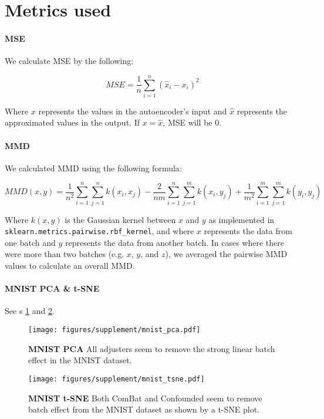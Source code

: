 \documentclass{article}
\begin{document}
\section{Metrics used}

\paragraph{MSE}

We calculate MSE by the following:

\begin{equation}
	\label{mse}
	MSE = \frac{1}{n}\sum_{i=1}^n{(\hat{x}_i - x_i)^2}
\end{equation}

Where $x$ represents the values in the autoencoder's input and $\hat{x}$ represents the approximated values in the output.
If $x = \hat{x}$, MSE will be 0.

\paragraph{MMD}

We calculated MMD using the following formula:

\begin{equation}
	\label{mmd}
	MMD(x, y) = \frac{1}{n^2}\sum_{i=1}^n{\sum_{j=1}^n{k(x_i, x_j)}} - \frac{2}{nm}\sum_{i=1}^n{\sum_{j=1}^m{k(x_i, y_j)}} + \frac{1}{m^2}\sum_{i=1}^m{\sum_{j=1}^m{k(y_i, y_j)}}
\end{equation}

Where $k(x, y)$ is the Gaussian kernel between $x$ and $y$ as implemented in \texttt{sklearn.metrics.pairwise.rbf\_kernel}, and where $x$ represents the data from one batch and $y$ represents the data from another batch.
In cases where there were more than two batches (e.g. $x$, $y$, and $z$), we averaged the pairwise MMD values to calculate an overall MMD.

\paragraph{MNIST PCA \& t-SNE}

See \figurename{s} \ref{fig:pca} and \ref{fig:tsne}.

\begin{figure}
	\centering
	\texttt{[image: figures/supplement/mnist\_pca.pdf]}
	\caption{\textbf{MNIST PCA}
	All adjusters seem to remove the strong linear batch effect in the MNIST dataset.
	}
	\label{fig:pca}
\end{figure}
\begin{figure}
	\centering
	\texttt{[image: figures/supplement/mnist\_tsne.pdf]}
	\caption{\textbf{MNIST t-SNE}
	Both ComBat and Confounded seem to remove batch effect from the MNIST dataset as shown by a t-SNE plot.
	}
	\label{fig:tsne}
\end{figure}


\end{document}
